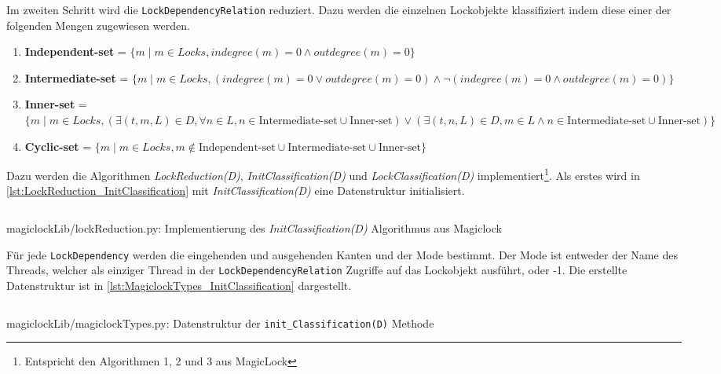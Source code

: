 Im zweiten Schritt wird die \texttt{LockDependencyRelation} reduziert. Dazu
werden die einzelnen Lockobjekte klassifiziert indem diese einer der folgenden
Mengen zugewiesen werden\autocite[4]{MagicLock}.
\begin{enumerate}
  \item \textbf{Independent-set} = $\{m \mid m \in Locks, indegree(m) = 0 \land
  outdegree(m) = 0\}$
  \item \textbf{Intermediate-set} = $\{m \mid m \in Locks, (indegree(m) = 0 \lor
  outdegree(m) = 0) \land \lnot (indegree(m) = 0 \land outdegree(m) = 0)\}$
  \item \textbf{Inner-set} = $\{m \mid m \in Locks, (\exists (t,m,L) \in D,
  \forall n \in L, n \in \text{Intermediate-set} \cup \text{Inner-set}) \lor
  (\exists (t,n,L) \in D, m \in L \land n \in \text{Intermediate-set} \cup
  \text{Inner-set})\}$
  \item \textbf{Cyclic-set} = $\{m \mid m \in Locks, m \notin
  \text{Independent-set} \cup \text{Intermediate-set} \cup \text{Inner-set}\}$
\end{enumerate}
Dazu werden die Algorithmen \textit{LockReduction(D)},
\textit{InitClassification(D)} und \textit{LockClassification(D)}
implementiert\footnote{Entspricht den Algorithmen 1, 2 und 3 aus
MagicLock\autocite[5]{MagicLock}}. Als erstes wird in
\cref{lst:LockReduction_InitClassification} mit \textit{InitClassification(D)}
eine Datenstruktur initialisiert.
\begin{listing}[ht]
  \inputminted[frame=lines,linenos,firstline=17,lastline=32]{python}{./Python/magiclockLib/lockReduction.py}
  \caption{magiclockLib/lockReduction.py: Implementierung des \textit{InitClassification(D)} Algorithmus aus Magiclock\autocite[5]{MagicLock}}
  \label{lst:LockReduction_InitClassification}
\end{listing}
Für jede \texttt{LockDependency} werden die eingehenden und ausgehenden Kanten
und der Mode bestimmt. Der Mode ist entweder der Name des Threads, welcher als
einziger Thread in der \texttt{LockDependencyRelation} Zugriffe auf das
Lockobjekt ausführt, oder -1. Die erstellte Datenstruktur ist in
\cref{lst:MagiclockTypes_InitClassification} dargestellt.
\begin{listing}[ht]
  \inputminted[frame=lines,linenos,firstline=3,lastline=8]{python}{./Python/magiclockLib/magiclockTypes.py}
  \caption{magiclockLib/magiclockTypes.py: Datenstruktur der \texttt{init\_Classification(D)} Methode}
  \label{lst:MagiclockTypes_InitClassification}
\end{listing}
